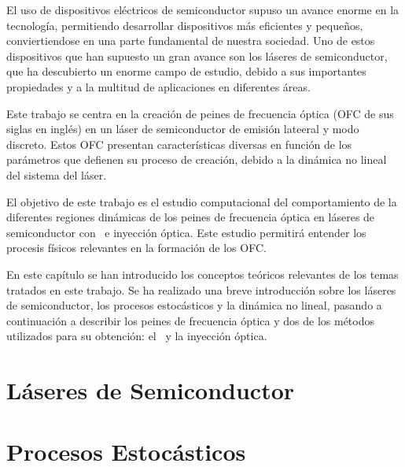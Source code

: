 El uso de dispositivos el\'ectricos de semiconductor supuso un avance enorme en la tecnolog\'ia, permitiendo desarrollar dispositivos m\'as eficientes y pequeños, conviertiendose en una parte fundamental de nuestra sociedad. Uno de estos dispositivos que han supuesto un gran avance son los l\'aseres de semiconductor, que ha descubierto un enorme campo de estudio, debido a sus importantes propiedades y a la multitud de aplicaciones en diferentes \'areas.

Este trabajo se centra en la creaci\'on de peines de frecuencia \'optica (OFC de sus siglas en ingl\'es) en un l\'aser de semiconductor de emisi\'on lateeral y modo discreto. Estos OFC presentan caracter\'isticas diversas en funci\'on de los par\'ametros que defienen su proceso de creaci\'on, debido a la din\'amica no lineal del sistema del l\'aser.

El objetivo de este trabajo es el estudio computacional del comportamiento de la diferentes regiones din\'amicas de los peines de frecuencia \'optica en l\'aseres de semiconductor con \gs\ e inyecci\'on \'optica. Este estudio permitir\'a entender los procesis f\'isicos relevantes en la formaci\'on de los OFC.

En este cap\'itulo se han introducido los conceptos te\'oricos relevantes de los temas tratados en este trabajo. Se ha realizado una breve introducci\'on sobre los l\'aseres de semiconductor, los procesos estoc\'asticos y la din\'amica no lineal, pasando a continuaci\'on a describir los peines de frecuencia \'optica y dos de los m\'etodos utilizados para su obtenci\'on: el \gs\ y la inyecci\'on \'optica.

	\section{Láseres de Semiconductor}
		\label{Intr:LsrSmcdtr}
		
		

	\section{Procesos Estocásticos}
		\label{Intr:PrcsEstcs}
		
		

